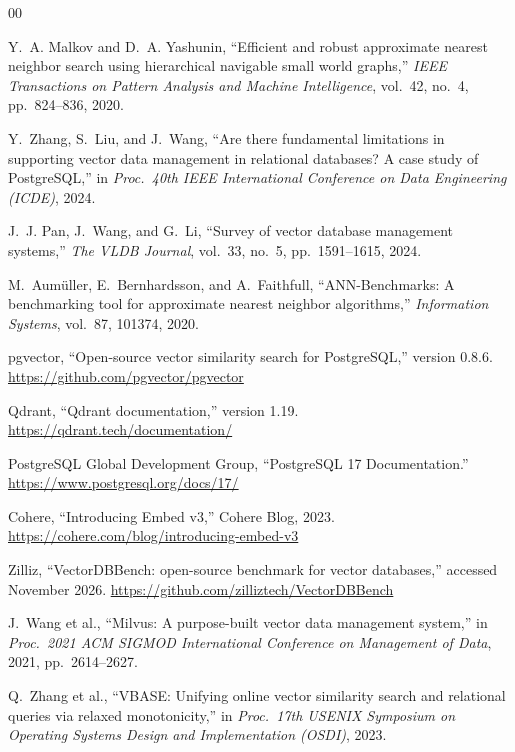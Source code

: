 \documentclass[preprint,12pt]{elsarticle}
\begin{document}
\begin{thebibliography}{00}

Y.~A. Malkov and D.~A. Yashunin, ``Efficient and robust approximate nearest
neighbor search using hierarchical navigable small world graphs,''
\textit{IEEE Transactions on Pattern Analysis and Machine Intelligence},
vol.~42, no.~4, pp.~824--836, 2020.

Y.~Zhang, S.~Liu, and J.~Wang, ``Are there fundamental limitations in supporting
vector data management in relational databases? A case study of PostgreSQL,'' in
\textit{Proc.\ 40th IEEE International Conference on Data Engineering (ICDE)}, 2024.

J.~J. Pan, J.~Wang, and G.~Li, ``Survey of vector database management systems,''
\textit{The VLDB Journal}, vol.~33, no.~5, pp.~1591--1615, 2024.

M.~Aumüller, E.~Bernhardsson, and A.~Faithfull, ``ANN-Benchmarks: A benchmarking tool
for approximate nearest neighbor algorithms,'' \textit{Information Systems}, vol.~87,
101374, 2020.

pgvector, ``Open-source vector similarity search for PostgreSQL,'' version 0.8.6.
\url{https://github.com/pgvector/pgvector}

Qdrant, ``Qdrant documentation,'' version 1.19. \url{https://qdrant.tech/documentation/}

PostgreSQL Global Development Group, ``PostgreSQL 17 Documentation.''
\url{https://www.postgresql.org/docs/17/}

Cohere, ``Introducing Embed v3,'' Cohere Blog, 2023.
\url{https://cohere.com/blog/introducing-embed-v3}

Zilliz, ``VectorDBBench: open-source benchmark for vector databases,'' accessed
November 2026. \url{https://github.com/zilliztech/VectorDBBench}

J.~Wang et al., ``Milvus: A purpose-built vector data management system,'' in
\textit{Proc.\ 2021 ACM SIGMOD International Conference on Management of Data}, 2021,
pp.~2614--2627.

Q.~Zhang et al., ``VBASE: Unifying online vector similarity search and relational queries
via relaxed monotonicity,'' in \textit{Proc.\ 17th USENIX Symposium on Operating Systems
Design and Implementation (OSDI)}, 2023.


\end{thebibliography}
\end{document}
